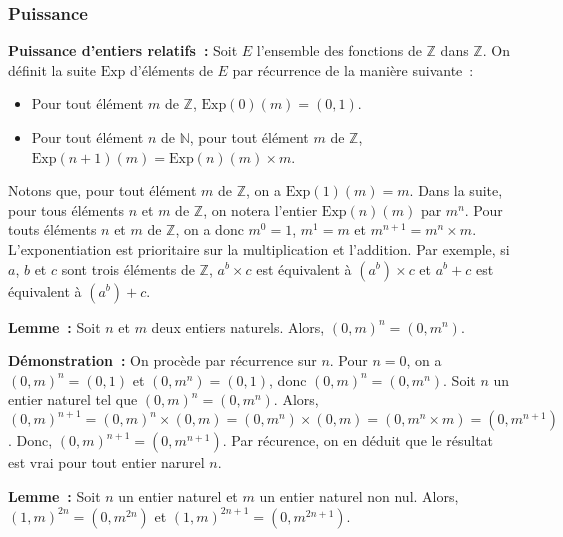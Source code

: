 \done

\subsubsection{Puissance}

\noindent\textbf{Puissance d'entiers relatifs :} Soit $E$ l'ensemble des fonctions de $\mathbb{Z}$ dans $\mathbb{Z}$. 
    On définit la suite $\mathrm{Exp}$ d'éléments de $E$ par récurrence de la manière suivante : 
    \begin{itemize}[nosep]
        \item Pour tout élément $m$ de $\mathbb{Z}$, $\mathrm{Exp}(0)(m) = (0,1)$.
        \item Pour tout élément $n$ de $\mathbb{N}$, pour tout élément $m$ de $\mathbb{Z}$, $\mathrm{Exp}(n+1)(m) = \mathrm{Exp}(n)(m) \times m$.
    \end{itemize}
    Notons que, pour tout élément $m$ de $\mathbb{Z}$, on a $\mathrm{Exp}(1)(m) = m$. 
    Dans la suite, pour tous éléments $n$ et $m$ de $\mathbb{Z}$, on notera l'entier $\mathrm{Exp}(n)(m)$ par $m^n$. 
    Pour touts éléments $n$ et $m$ de $\mathbb{Z}$, on a donc $m^0=1$, $m^1 = m$ et $m^{n+1} = m^n \times m$. 
    L'exponentiation est prioritaire sur la multiplication et l'addition. 
    Par exemple, si $a$, $b$ et $c$ sont trois éléments de $\mathbb{Z}$, $a^b \times c$ est équivalent à $(a^b) \times c$ et $a^b + c$ est équivalent à $(a^b) + c$.

\medskip

\noindent\textbf{Lemme :} Soit $n$ et $m$ deux entiers naturels. 
    Alors, $(0,m)^n = (0,m^n)$.

\medskip

\noindent\textbf{Démonstration :} On procède par récurrence sur $n$.
    Pour $n = 0$, on a $(0,m)^n = (0,1)$ et $(0,m^n) = (0,1)$, donc $(0,m)^n = (0,m^n)$.
    Soit $n$ un entier naturel tel que $(0,m)^n = (0,m^n)$. 
    Alors, $(0,m)^{n+1} = (0,m)^n \times (0,m) = (0,m^n) \times (0,m) = (0, m^n \times m) = (0, m^{n+1})$. 
    Donc, $(0,m)^{n+1} = (0,m^{n+1})$.
    Par récurence, on en déduit que le résultat est vrai pour tout entier narurel $n$.

   \done 

\medskip

\noindent\textbf{Lemme :} Soit $n$ un entier naturel et $m$ un entier naturel non nul. 
    Alors, $(1,m)^{2n} = (0,m^{2n})$ et $(1,m)^{2n+1} = (0,m^{2n+1})$.

\medskip

